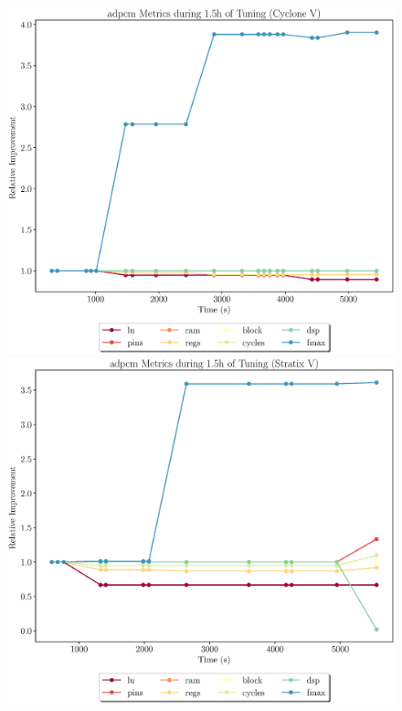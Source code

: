 \documentclass[12pt, a4paper]{article}
\begin{document}
\begin{figure}[htpb]
    \begin{minipage}{.48\textwidth}
        \includegraphics[scale=.25]{adpcm_all_5400_chstone_CycloneV}
    \end{minipage}%
    \hfill
    \begin{minipage}{.48\textwidth}
        \includegraphics[scale=.25]{adpcm_all_5400_chstone_StratixV}
    \end{minipage}%


\end{figure}
\end{document}
